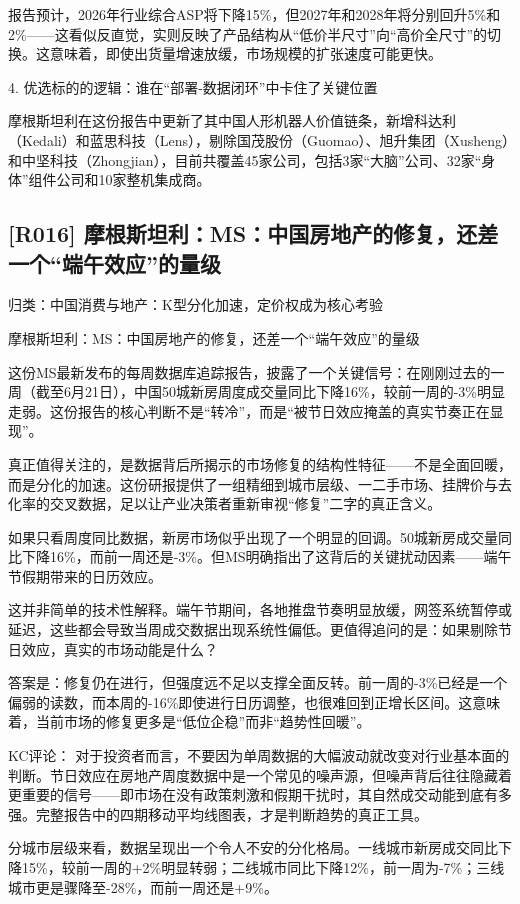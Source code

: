 \documentclass[11pt]{ctexart}
\begin{document}
报告预计，2026年行业综合ASP将下降15\%，但2027年和2028年将分别回升5\%和2\%——这看似反直觉，实则反映了产品结构从“低价半尺寸”向“高价全尺寸”的切换。这意味着，即使出货量增速放缓，市场规模的扩张速度可能更快。

4. 优选标的的逻辑：谁在“部署-数据闭环”中卡住了关键位置

摩根斯坦利在这份报告中更新了其中国人形机器人价值链条，新增科达利（Kedali）和蓝思科技（Lens），剔除国茂股份（Guomao）、旭升集团（Xusheng）和中坚科技（Zhongjian），目前共覆盖45家公司，包括3家“大脑”公司、32家“身体”组件公司和10家整机集成商。

\subsection{[R016] 摩根斯坦利：MS：中国房地产的修复，还差一个“端午效应”的量级}
{\small\color{refgray}归类：中国消费与地产：K型分化加速，定价权成为核心考验}

摩根斯坦利：MS：中国房地产的修复，还差一个“端午效应”的量级

这份MS最新发布的每周数据库追踪报告，披露了一个关键信号：在刚刚过去的一周（截至6月21日），中国50城新房周度成交量同比下降16\%，较前一周的-3\%明显走弱。这份报告的核心判断不是“转冷”，而是“被节日效应掩盖的真实节奏正在显现”。

真正值得关注的，是数据背后所揭示的市场修复的结构性特征——不是全面回暖，而是分化的加速。这份研报提供了一组精细到城市层级、一二手市场、挂牌价与去化率的交叉数据，足以让产业决策者重新审视“修复”二字的真正含义。

如果只看周度同比数据，新房市场似乎出现了一个明显的回调。50城新房成交量同比下降16\%，而前一周还是-3\%。但MS明确指出了这背后的关键扰动因素——端午节假期带来的日历效应。

这并非简单的技术性解释。端午节期间，各地推盘节奏明显放缓，网签系统暂停或延迟，这些都会导致当周成交数据出现系统性偏低。更值得追问的是：如果剔除节日效应，真实的市场动能是什么？

答案是：修复仍在进行，但强度远不足以支撑全面反转。前一周的-3\%已经是一个偏弱的读数，而本周的-16\%即使进行日历调整，也很难回到正增长区间。这意味着，当前市场的修复更多是“低位企稳”而非“趋势性回暖”。

KC评论： 对于投资者而言，不要因为单周数据的大幅波动就改变对行业基本面的判断。节日效应在房地产周度数据中是一个常见的噪声源，但噪声背后往往隐藏着更重要的信号——即市场在没有政策刺激和假期干扰时，其自然成交动能到底有多强。完整报告中的四期移动平均线图表，才是判断趋势的真正工具。

分城市层级来看，数据呈现出一个令人不安的分化格局。一线城市新房成交同比下降15\%，较前一周的+2\%明显转弱；二线城市同比下降12\%，前一周为-7\%；三线城市更是骤降至-28\%，而前一周还是+9\%。
\end{document}
